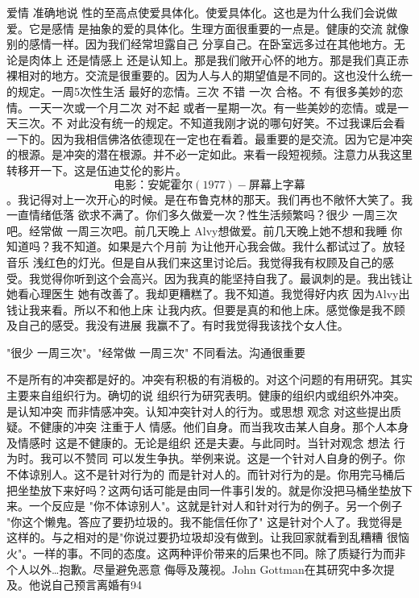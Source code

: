爱情 准确地说 性的至高点使爱具体化。使爱具体化。这也是为什么我们会说做爱。它是感情 是抽象的爱的具体化。生理方面很重要的一点是。健康的交流 就像别的感情一样。因为我们经常坦露自己 分享自己。在卧室远多过在其他地方。无论是肉体上 还是情感上 还是认知上。那是我们敞开心怀的地方。那是我们真正赤裸相对的地方。交流是很重要的。因为人与人的期望值是不同的。这也没什么统一的规定。一周5次性生活 最好的恋情。三次 不错 一次 合格。不 有很多美妙的恋情。一天一次或一个月二次 对不起 或者一星期一次。有一些美妙的恋情。或是一天三次。不 对此没有统一的规定。不知道我刚才说的哪句好笑。不过我课后会看一下的。因为我相信佛洛依德现在一定也在看着。最重要的是交流。因为它是冲突的根源。是冲突的潜在根源。并不必一定如此。来看一段短视频。注意力从我这里转移开一下。这是伍迪艾伦的影片。\[电影：安妮霍尔(1977)-屏幕上字幕\]。我记得对上一次开心的时候。是在布鲁克林的那天。我们再也不敞怀大笑了。我一直情绪低落 欲求不满了。你们多久做爱一次？性生活频繁吗？很少 一周三次吧。经常做 一周三次吧。前几天晚上 Alvy想做爱。前几天晚上她不想和我睡 你知道吗？我不知道。如果是六个月前 为让他开心我会做。我什么都试过了。放轻音乐 浅红色的灯光。但是自从我们来这里讨论后。我觉得我有权顾及自己的感受。我觉得你听到这个会高兴。因为我真的能坚持自我了。最讽刺的是。我出钱让她看心理医生 她有改善了。我却更糟糕了。我不知道。我觉得好内疚 因为Alvy出钱让我来看。所以不和他上床 让我内疚。但要是真的和他上床。感觉像是我不顾及自己的感受。我没有进展 我赢不了。有时我觉得我该找个女人住。 

"很少 一周三次"。"经常做 一周三次" 不同看法。沟通很重要 

不是所有的冲突都是好的。冲突有积极的有消极的。对这个问题的有用研究。其实主要来自组织行为。确切的说 组织行为研究表明。健康的组织内或组织外冲突。是认知冲突 而非情感冲突。认知冲突针对人的行为。或思想 观念 对这些提出质疑。不健康的冲突 注重于人 情感。他们自身。而当我攻击某人自身。那个人本身及情感时 这是不健康的。无论是组织 还是夫妻。与此同时。当针对观念 想法 行为时。我可以不赞同 可以发生争执。举例来说。这是一个针对人自身的例子。你不体谅别人。这不是针对行为的 而是针对人的。而针对行为的是。你用完马桶后把坐垫放下来好吗？这两句话可能是由同一件事引发的。就是你没把马桶坐垫放下来。一个反应是 "你不体谅别人"。这就是针对人和针对行为的例子。另一个例子 "你这个懒鬼。答应了要扔垃圾的。我不能信任你了" 这是针对个人了。我觉得是这样的。与之相对的是"你说过要扔垃圾却没有做到。让我回家就看到乱糟糟 很恼火"。一样的事。不同的态度。这两种评价带来的后果也不同。除了质疑行为而非个人以外…抱歉。尽量避免恶意 侮辱及蔑视。John Gottman在其研究中多次提及。他说自己预言离婚有94%

